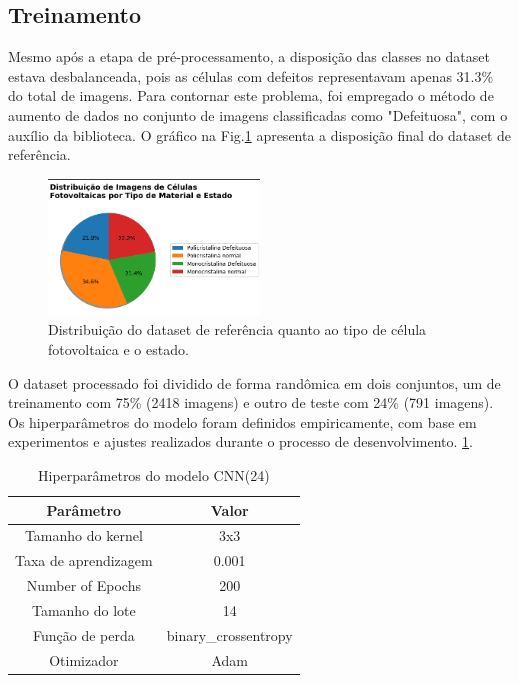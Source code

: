 \documentclass[conference]{IEEEtran}
\begin{document}
\subsection{Treinamento}\label{AA}

Mesmo após a etapa de pré-processamento, a disposição das classes no dataset
estava desbalanceada, pois as células com defeitos representavam apenas
31.3\% do total de imagens. Para contornar este problema, foi empregado
o método de aumento de dados no conjunto de imagens classificadas como
"Defeituosa", com o auxílio da biblioteca. O gráfico na
Fig.\ref{fig:dataset-overview} apresenta a disposição final do dataset de
referência.

\begin{figure}[htbp]

    \centerline{\includegraphics[width=0.5\textwidth]{images/dataset-overview.png}}
    \caption{Distribuição do dataset de referência quanto ao tipo de célula
        fotovoltaica e o estado.}
    \label{fig:dataset-overview}
\end{figure}

O dataset processado foi dividido de forma randômica em dois conjuntos, um de
treinamento
com 75\% (2418 imagens) e outro de teste com 24\% (791 imagens). Os
hiperparâmetros do modelo foram definidos empiricamente, com base em
experimentos e ajustes realizados durante o processo de desenvolvimento.
\ref{tab:hiperparametros}.

\begin{table}[h!]
    \caption{Hiperparâmetros do modelo CNN(24)}
    \centering
    \begin{tabular}{|c|c|}
        \hline
        \textbf{Parâmetro}   & \textbf{Valor}       \\ \hline
        Tamanho do kernel    & 3x3                  \\ \hline
        Taxa de aprendizagem & 0.001                \\ \hline
        Number of Epochs     & 200                  \\ \hline
        Tamanho do lote      & 14                   \\ \hline
        Função de perda      & binary\_crossentropy \\ \hline
        Otimizador           & Adam                 \\ \hline
    \end{tabular}
    \label{tab:hiperparametros}
\end{table}
\end{document}
